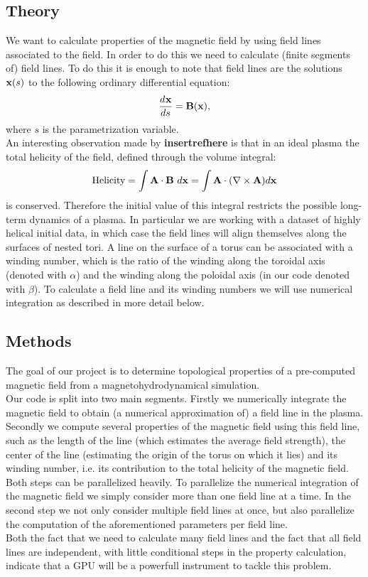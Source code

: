 \documentclass{article}
\newcommand{\Dif}[3][ ]{\ensuremath{\frac{d^{#1} #2}{{d #3}^{#1}}}}
\renewcommand{\vec}{\bold}
\begin{document}
\subsection{Theory}
We want to calculate properties of the magnetic field by using field lines associated to the field. In order to do this we need to calculate (finite segments of) field lines. To do this it is enough to note that field lines are the solutions $\vec x(s)$ to the following ordinary differential equation:
\[\Dif{\vec x}{s} = \vec B(\vec x),\]
where $s$ is the parametrization variable.\\
An interesting observation made by \textbf{insertrefhere} is that in an ideal plasma the total helicity of the field, defined through the volume integral:
\[
\text{Helicity} = \int\vec{A}\cdot\vec{B}\ d\vec{x} = \int\vec{A}\cdot (\nabla\times\vec{A})d\vec{x}
\]
is conserved. Therefore the initial value of this integral restricts the possible long-term dynamics of a plasma. In particular we are working with a dataset of highly helical initial data, in which case the field lines will align themselves along the surfaces of nested tori. A line on the surface of a torus can be associated with a winding number, which is the ratio of the winding along the toroidal axis (denoted with $\alpha$) and the winding along the poloidal axis (in our code denoted with $\beta$). To calculate a field line and its winding numbers we will use numerical integration as described in more detail below.


\subsection{Methods}
The goal of our project is to determine topological properties of a pre-computed magnetic field from a magnetohydrodynamical simulation.\\
Our code is split into two main segments. Firstly we numerically integrate the magnetic field to obtain (a numerical approximation of) a field line in the plasma. Secondly we compute several properties of the magnetic field using this field line, such as the length of the line (which estimates the average field strength), the center of the line (estimating the origin of the torus on which it lies) and its winding number, i.e. its contribution to the total helicity of the magnetic field.\\
Both steps can be parallelized heavily. To parallelize the numerical integration of the magnetic field we simply consider more than one field line at a time. In the second step we not only consider multiple field lines at once, but also parallelize the computation of the aforementioned parameters per field line.\\
Both the fact that we need to calculate many field lines and the fact that all field lines are independent, with little conditional steps in the property calculation, indicate that a GPU will be a powerfull instrument to tackle this problem.
\end{document}
